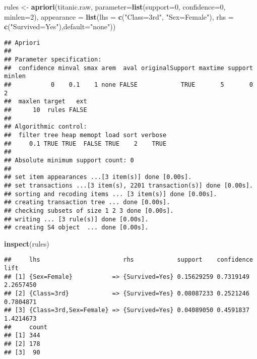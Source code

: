 \documentclass[]{article}
\newenvironment{Shaded}{\begin{snugshade}}{\end{snugshade}}
\newcommand{\DataTypeTok}[1]{\textcolor[rgb]{0.13,0.29,0.53}{#1}}
\newcommand{\DecValTok}[1]{\textcolor[rgb]{0.00,0.00,0.81}{#1}}
\newcommand{\KeywordTok}[1]{\textcolor[rgb]{0.13,0.29,0.53}{\textbf{#1}}}
\newcommand{\NormalTok}[1]{#1}
\newcommand{\StringTok}[1]{\textcolor[rgb]{0.31,0.60,0.02}{#1}}
\begin{document}
\begin{Shaded}
\begin{Highlighting}[]
\NormalTok{rules <-}\StringTok{ }\KeywordTok{apriori}\NormalTok{(titanic.raw, }\DataTypeTok{parameter=}\KeywordTok{list}\NormalTok{(}\DataTypeTok{support=}\DecValTok{0}\NormalTok{, }\DataTypeTok{confidence=}\DecValTok{0}\NormalTok{, }\DataTypeTok{minlen=}\DecValTok{2}\NormalTok{), }
                 \DataTypeTok{appearance =} \KeywordTok{list}\NormalTok{(}\DataTypeTok{lhs =} \KeywordTok{c}\NormalTok{(}\StringTok{"Class=3rd"}\NormalTok{, }\StringTok{"Sex=Female"}\NormalTok{), }
                                   \DataTypeTok{rhs =} \KeywordTok{c}\NormalTok{(}\StringTok{"Survived=Yes"}\NormalTok{),}\DataTypeTok{default=}\StringTok{"none"}\NormalTok{))}
\end{Highlighting}
\end{Shaded}

\begin{verbatim}
## Apriori
## 
## Parameter specification:
##  confidence minval smax arem  aval originalSupport maxtime support minlen
##           0    0.1    1 none FALSE            TRUE       5       0      2
##  maxlen target   ext
##      10  rules FALSE
## 
## Algorithmic control:
##  filter tree heap memopt load sort verbose
##     0.1 TRUE TRUE  FALSE TRUE    2    TRUE
## 
## Absolute minimum support count: 0 
## 
## set item appearances ...[3 item(s)] done [0.00s].
## set transactions ...[3 item(s), 2201 transaction(s)] done [0.00s].
## sorting and recoding items ... [3 item(s)] done [0.00s].
## creating transaction tree ... done [0.00s].
## checking subsets of size 1 2 3 done [0.00s].
## writing ... [3 rule(s)] done [0.00s].
## creating S4 object  ... done [0.00s].
\end{verbatim}

\begin{Shaded}
\begin{Highlighting}[]
\KeywordTok{inspect}\NormalTok{(rules)}
\end{Highlighting}
\end{Shaded}

\begin{verbatim}
##     lhs                       rhs            support    confidence lift     
## [1] {Sex=Female}           => {Survived=Yes} 0.15629259 0.7319149  2.2657450
## [2] {Class=3rd}            => {Survived=Yes} 0.08087233 0.2521246  0.7804871
## [3] {Class=3rd,Sex=Female} => {Survived=Yes} 0.04089050 0.4591837  1.4214673
##     count
## [1] 344  
## [2] 178  
## [3]  90
\end{verbatim}
\end{document}
